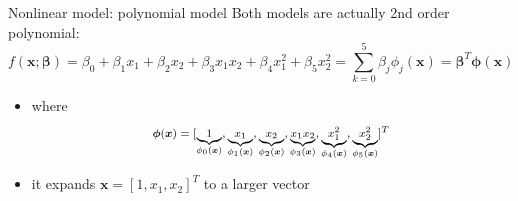 \documentclass[ignorenonframetext,aspectratio=169]{beamer}
\newcommand{\vv}[1]{\boldsymbol{#1}}
\begin{document}
\begin{frame}{Nonlinear model: polynomial model}
Both models are actually 2nd order polynomial:
\footnotesize\[f(\vv{x};\vv{\beta}) = \beta_0+ \beta_1x_1+ \beta_2x_2 +\beta_3x_1x_2+\beta_4x_1^2 +\beta_5x_2^2 =\sum_{k=0}^5 \beta_j \phi_j(\vv{x})=\vv{\beta}^T\vv{\phi}(\vv{x})\]

\normalsize

\begin{itemize}
\item
  where
  \[\footnotesize \vv{\phi}(\vv{x}) = [\underbrace{1}_{\phi_0(\vv{x})}, \underbrace{x_1}_{\phi_1(\vv{x})}, \underbrace{x_2}_{\phi_2(\vv{x})}, \underbrace{x_1x_2}_{\phi_3(\vv{x})}, \underbrace{x_1^2}_{\phi_4(\vv{x})}, \underbrace{x_2^2}_{\phi_5(\vv{x})}]^T\]
\item
  it expands \(\vv{x}=[1, x_1, x_2]^T\) to a larger vector
\end{itemize}

\end{frame}
\end{document}
